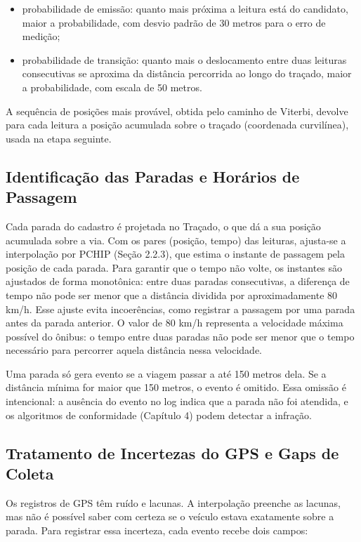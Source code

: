 \begin{itemize}
  \item probabilidade de emissão: quanto mais próxima a leitura está do candidato, maior a probabilidade, com desvio padrão de 30 metros para o erro de medição;
  \item probabilidade de transição: quanto mais o deslocamento entre duas leituras consecutivas se aproxima da distância percorrida ao longo do traçado, maior a probabilidade, com escala de 50 metros.
\end{itemize}

A sequência de posições mais provável, obtida pelo caminho de Viterbi, devolve para cada leitura a posição acumulada sobre o traçado (coordenada curvilínea), usada na etapa seguinte.

\subsection{Identificação das Paradas e Horários de Passagem}\label{subsec:paradasHorarios}

Cada parada do cadastro é projetada no Traçado, o que dá a sua posição acumulada sobre a via. Com os pares (posição, tempo) das leituras, ajusta-se a interpolação por PCHIP (Seção 2.2.3), que estima o instante de passagem pela posição de cada parada. Para garantir que o tempo não volte, os instantes são ajustados de forma monotônica: entre duas paradas consecutivas, a diferença de tempo não pode ser menor que a distância dividida por aproximadamente 80 km/h. Esse ajuste evita incoerências, como registrar a passagem por uma parada antes da parada anterior. O valor de 80 km/h representa a velocidade máxima possível do ônibus: o tempo entre duas paradas não pode ser menor que o tempo necessário para percorrer aquela distância nessa velocidade.

Uma parada só gera evento se a viagem passar a até 150 metros dela. Se a distância mínima for maior que 150 metros, o evento é omitido. Essa omissão é intencional: a ausência do evento no log indica que a parada não foi atendida, e os algoritmos de conformidade (Capítulo 4) podem detectar a infração.

\subsection{Tratamento de Incertezas do GPS e Gaps de Coleta}\label{subsec:incertezasGaps}

Os registros de GPS têm ruído e lacunas. A interpolação preenche as lacunas, mas não é possível saber com certeza se o veículo estava exatamente sobre a parada. Para registrar essa incerteza, cada evento recebe dois campos:

